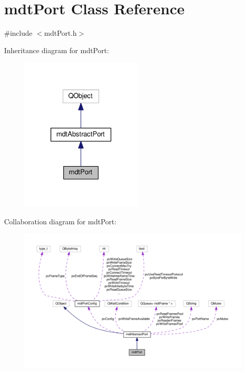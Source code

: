 \hypertarget{classmdt_port}{\section{mdt\-Port Class Reference}
\label{classmdt_port}
}


{\ttfamily \#include $<$mdt\-Port.\-h$>$}



Inheritance diagram for mdt\-Port\-:\nopagebreak
\begin{figure}[H]
\begin{center}
\leavevmode
\includegraphics[width=166pt]{classmdt_port__inherit__graph}
\end{center}
\end{figure}


Collaboration diagram for mdt\-Port\-:\nopagebreak
\begin{figure}[H]
\begin{center}
\leavevmode
\includegraphics[width=350pt]{classmdt_port__coll__graph}
\end{center}
\end{figure}
